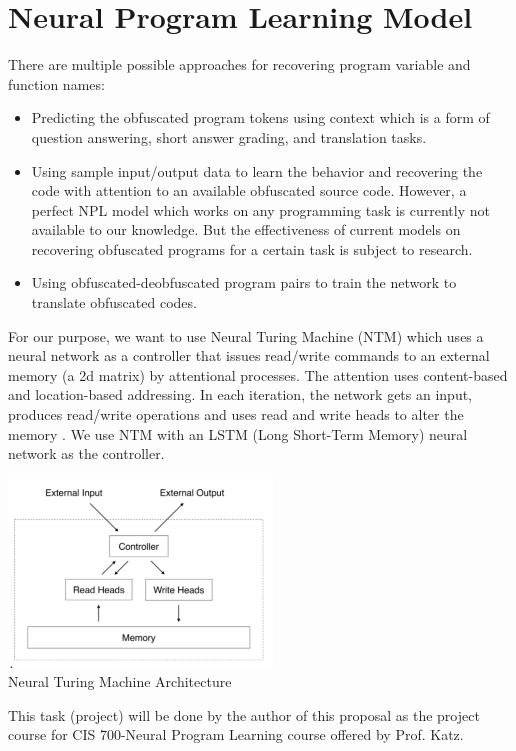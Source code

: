 \documentclass{rureport}
\begin{document}
\section{Neural Program Learning Model}
There are multiple possible approaches for recovering program variable and function names:
\vspace{-1mm}
\begin{itemize}
	\item Predicting the obfuscated program tokens using context which is a form of question answering, short answer grading, and translation tasks.
\vspace{-2mm}
	\item Using sample input/output data to learn the behavior and recovering the code with attention to an available obfuscated source code. However, a perfect NPL model which works on any programming task is currently not available to our knowledge. But the effectiveness of current models on recovering obfuscated programs for a certain task is subject to research.
\vspace{-2mm}
	\item Using obfuscated-deobfuscated program pairs to train the network to translate obfuscated codes.
\end{itemize}
For our purpose, we want to use Neural Turing Machine (NTM) which uses a neural network as a controller that issues read/write commands to an external memory (a 2d matrix) by attentional processes. The attention uses content-based and location-based addressing. In each iteration, the network gets an input, produces read/write operations and uses read and write heads to alter the memory \cite{ntm,neelkant}. We use NTM with an LSTM (Long Short-Term Memory) \cite{lstm} neural network as the controller.


\begin{center}
	\includegraphics[width=7cm]{ntm}\vspace{-3mm}
	\\\small Neural Turing Machine Architecture \cite{ntm}
\end{center}

\vspace{1cm}
   
This task (project) will be done by the author of this proposal as the project course for CIS 700-Neural Program Learning course offered by Prof. Katz.




\end{document}
